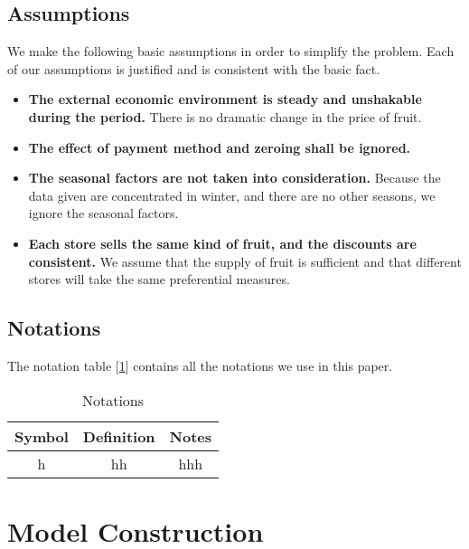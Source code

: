 \documentclass{mcmthesis}
\begin{document}
\subsection{Assumptions}
We make the following basic assumptions in order to simplify the problem. Each
of our assumptions is justified and is consistent with the basic fact.
\begin{itemize}
\item \textbf{The external economic environment is steady and unshakable during the period.} There is no dramatic change in the price of fruit.
\item \textbf{The effect of payment method and zeroing shall be ignored.}
\item \textbf{The seasonal factors are not taken into consideration.} Because the data given are concentrated in winter, and there are no other seasons, we ignore the seasonal factors.
\item \textbf{Each store sells the same kind of fruit, and the discounts are consistent.} We assume that the supply of fruit is sufficient and that different stores will take the same preferential measures.
\end{itemize}

\subsection{Notations}
The notation table [\ref{table-notations}] contains all the notations we use in this paper.
\begin{table}[h]
    \centering
    \caption{Notations} \label{table-notations}
    \begin{tabular}{ccc}
    \toprule
        Symbol & Definition & Notes\\
    \midrule
        h & hh & hhh\\
    \bottomrule
    \end{tabular}
\end{table}

\section{Model Construction}
\end{document}
